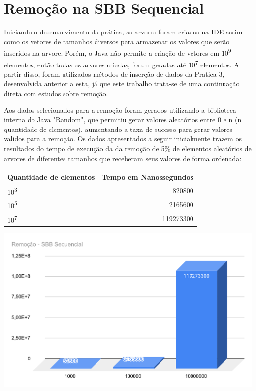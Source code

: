 \label{desenvolvimento}
\section{Remoção na SBB Sequencial}
    Iniciando o desenvolvimento da prática, as arvores foram criadas na IDE assim como os vetores de tamanhos diversos para armazenar os valores que serão inseridos na arvore. Porém, o Java não permite a criação de vetores em 10\textsuperscript{9} elementos, então todas as arvores criadas, foram geradas até 10\textsuperscript{7} elementos. A partir disso, foram utilizados métodos de inserção de dados da Pratica 3, desenvolvida anterior a esta, já que este trabalho trata-se de uma continuação direta com estudos sobre remoção.
    
    Aos dados selecionados para a remoção foram gerados utilizando a biblioteca interna do Java "Random", que permitiu gerar valores aleatórios entre 0 e n (n = quantidade de elementos), aumentando a taxa de sucesso para gerar valores validos para a remoção.
    Os dados apresentados a seguir inicialmente trazem os resultados do tempo de execução da da remoção de 5\% de elementos aleatórios de arvores de diferentes tamanhos que receberam seus valores de forma ordenada:
    
    \begin{center}
        \begin{tabular}{| l | r |}
            \hline
            Quantidade de elementos & Tempo em Nanossegundos\\
            \hline
            10\textsuperscript{3} & 820800\\
            10\textsuperscript{5} & 2165600\\
            10\textsuperscript{7} & 119273300\\
            \hline
        \end{tabular}
    \end{center}

        \begin{center}
            \includegraphics[scale=0.8]{Trabalho AED/fig/chart.pdf}
            \label{fig:Grafico 1}
        \end{center}

